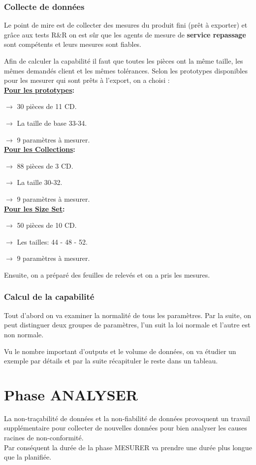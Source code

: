 \documentclass[12pt, a4paper]{thesis}
\begin{document}
\subsubsection{Collecte de données}
Le point de mire est de collecter des mesures du produit fini (prêt à exporter) et grâce aux tests R\&R on est sûr que les agents de mesure de \textbf{service repassage} sont compétents et leurs mesures sont fiables.

Afin de calculer la capabilité il faut que toutes les pièces ont la même taille, les mêmes demandés client et les mêmes tolérances. Selon les prototypes disponibles pour les mesurer qui sont prêts à l'export, on a choisi :\\
\textbf{\underline{Pour les prototypes}:}
\item $\longrightarrow$ 30 pièces de 11 CD.
\item $\longrightarrow$ La taille de base 33-34.
\item $\longrightarrow$ 9 paramètres à mesurer.\\
\textbf{\underline{Pour les Collections}:}
\item $\longrightarrow$ 88 pièces de 3 CD.
\item $\longrightarrow$ La taille 30-32.
\item $\longrightarrow$ 9 paramètres à mesurer.\\ 
\textbf{\underline{Pour les Size Set}:}
\item $\longrightarrow$ 50 pièces de 10 CD.
\item $\longrightarrow$ Les tailles: 44 - 48 - 52.
\item $\longrightarrow$ 9 paramètres à mesurer.

Ensuite, on a préparé des feuilles de relevés et on a pris les mesures. 

\subsubsection{Calcul de la capabilité}
Tout d'abord on va examiner la normalité de tous les paramètres. Par la suite, on peut distinguer deux groupes de paramètres, l'un suit la loi normale et l'autre est non normale.


Vu le nombre important d'outputs et le volume de données, on va étudier un exemple par détails et par la suite récapituler le reste dans un tableau.\\




\section{Phase ANALYSER}
La non-traçabilité de données et la non-fiabilité de données provoquent un travail supplémentaire pour collecter de nouvelles données pour bien analyser les causes racines de non-conformité.\\
Par conséquent la durée de la phase MESURER va prendre une durée plus longue que la planifiée.
\end{document}
